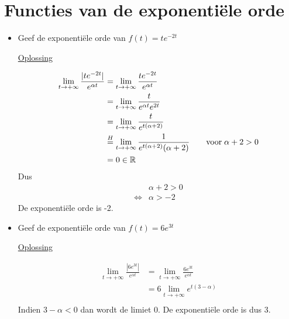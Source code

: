 \documentclass[12pt]{report}
\newcommand{\exercise}[2]{
#1


\underline{Oplossing}

#2

\hrulefill
}
\begin{document}
\section{Functies van de exponentiële orde}
\begin{itemize}[label={}]
 \item{
    \exercise{
            Geef de exponentiële orde van $f(t) = te^{-2t}$
    }{
            \begin{equation*}
             \begin{split}
              \lim_{t \to +\infty} \frac{|te^{-2t}|}{e^{\alpha t}} & = \lim_{t \to +\infty} \frac{te^{-2t}}{e^{\alpha t}} \\
                                                                   & = \lim_{t \to +\infty} \frac{t}{e^{\alpha t}e^{2t}}  \\
                                                                   & = \lim_{t \to +\infty} \frac{t}{e^{t(\alpha + 2)}}   \\
                                                                   & \stackrel{H}{=} \lim_{t \to +\infty} \frac{1}{e^{t(\alpha + 2)}(\alpha + 2)} \qquad \hbox{voor}\; \alpha + 2 > 0 \\
                                                                   & = 0 \in \mathbb{R}
             \end{split}
            \end{equation*}
            Dus
            \begin{equation*}
             \begin{split}
                              & \alpha + 2 > 0 \\
              \Leftrightarrow & \alpha > -2
             \end{split}
            \end{equation*}
            De exponentiële orde is -2.
        }}
 \item{
    \exercise{
        Geef de exponentiële orde van $f(t) = 6e^{3t}$
    }{
        \begin{equation*}
         \begin{split}
          \lim_{t \to +\infty} \frac{|6e^{3t}|}{e^{\alpha t}} & = \lim_{t \to +\infty} \frac{6e^{3t}}{e^{\alpha t}} \\
                                                              & = 6\lim_{t \to +\infty} e^{t(3 - \alpha)} \\                                                    
         \end{split}
        \end{equation*}
        Indien $ 3 - \alpha < 0$ dan wordt de limiet 0. De exponentiële orde is dus 3.
    }
 
 }
\end{itemize}
\end{document}
